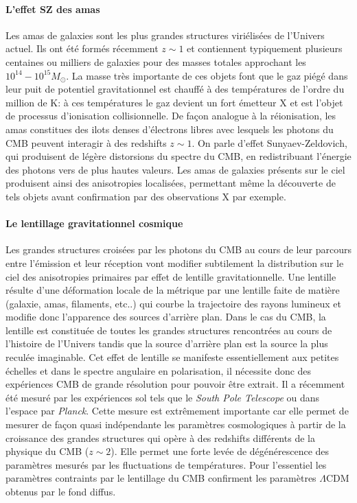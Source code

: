 \paragraph{L'effet SZ des amas}
Les amas de galaxies sont les plus grandes structures viriélisées de l'Univers actuel. Ils ont été formés récemment $z\sim 1$ et contiennent typiquement plusieurs centaines ou milliers de galaxies pour des masses totales approchant les $10^{14}-10^{15} M_\odot$. La masse très importante de ces objets font que le gaz piégé dans leur puit de potentiel gravitationnel est chauffé à des températures de l'ordre du million de K: à ces températures le gaz devient un fort émetteur X et est l'objet de processus d'ionisation collisionnelle. De façon analogue à la réionisation, les amas constitues des ilots denses d'électrons libres avec lesquels les photons du CMB peuvent interagir à des redshifts $z\sim 1$. On parle d'effet Sunyaev-Zeldovich, qui produisent de légère distorsions du spectre du CMB, en redistribuant l'énergie des photons vers de plus hautes valeurs. Les amas de galaxies présents sur le ciel produisent ainsi des anisotropies localisées, permettant même la découverte de tels objets avant confirmation par des observations X par exemple.

\paragraph{Le lentillage gravitationnel cosmique}
Les grandes structures croisées par les photons du CMB au cours de leur parcours entre l'émission et leur réception vont modifier subtilement la distribution sur le ciel des anisotropies primaires par effet de lentille gravitationnelle. Une lentille résulte d'une déformation locale de la métrique par une lentille faite de matière (galaxie, amas, filaments, etc..) qui courbe la trajectoire des rayons lumineux et modifie donc l'apparence des sources d'arrière plan. Dans le cas du CMB, la lentille est constituée de toutes les grandes structures rencontrées au cours de l'histoire de l'Univers tandis que la source d'arrière plan est la source la plus reculée imaginable. Cet effet de lentille se manifeste essentiellement aux petites échelles et dans le spectre angulaire en polarisation, il nécessite donc des expériences CMB de grande résolution pour pouvoir être extrait. Il a récemment été mesuré par les expériences sol tels que le \textit{South Pole Telescope} ou dans l'espace par \textit{Planck}. Cette mesure est extrêmement importante car elle permet de mesurer de façon quasi indépendante les paramètres cosmologiques à partir de la croissance des grandes structures qui opère à des redshifts différents de la physique du CMB ($z\sim 2$). Elle permet une forte levée de dégénérescence des paramètres mesurés par les fluctuations de températures. Pour l'essentiel les paramètres contraints par le lentillage du CMB confirment les paramètres $\Lambda$CDM obtenus par le fond diffus.